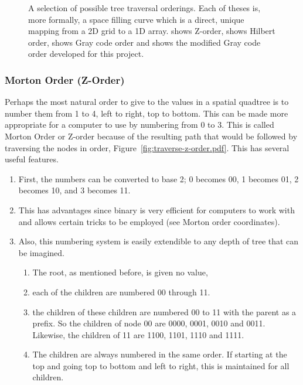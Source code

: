 \begin{figure}[tbhp]
	\caption[A selection of possible tree traversal orderings]{A selection of
		possible tree traversal orderings. Each of theses is, more formally, a
		space filling curve which is a direct, unique mapping from a 2D grid to
		a 1D array.  shows Z-order,
		 shows Hilbert order,
		 shows Gray code order and
		 shows the modified Gray code
		order developed for this project.}\label{fig:order_traversals}
\end{figure}

\subsubsection[Morton Order]{Morton Order (Z-Order)}
\label{ssub:morton_code_z_order_}

Perhaps the most natural order to give to the values in a spatial quadtree is
to number them from 1 to 4, left to right, top to bottom. This can be made
more appropriate for a computer to use by numbering from 0 to 3. This is
called Morton Order\cite{mortoncomputer} or Z-order because of the resulting
path that would be followed by traversing the nodes in order,
Figure~\ref{fig:traverse-z-order.pdf}. This has several useful features.

\begin{enumerate}
	\item First, the numbers can be converted to base 2; 0 becomes 00, 1
		becomes 01, 2 becomes 10, and 3 becomes 11.

	\item This has advantages since binary is very efficient for computers to
	work with and allows certain tricks to be employed (see Morton order
	coordinates).

	\item Also, this numbering system is easily extendible to any depth of
	tree that can be imagined.

	\begin{enumerate}
		\item The root, as mentioned before, is given no value,
		\item each of the children are numbered {00} through 11.

		\item the children of these children are numbered 00 to 11 with the
		parent as a prefix. So the children of node 00 are 0000, 0001, 0010
		and 0011. Likewise, the children of 11 are 1100, 1101, 1110 and 1111.

		\item The children are always numbered in the same order. If starting
		at the top and going top to bottom and left to right, this is
		maintained for all children.
	\end{enumerate}
\end{enumerate}


